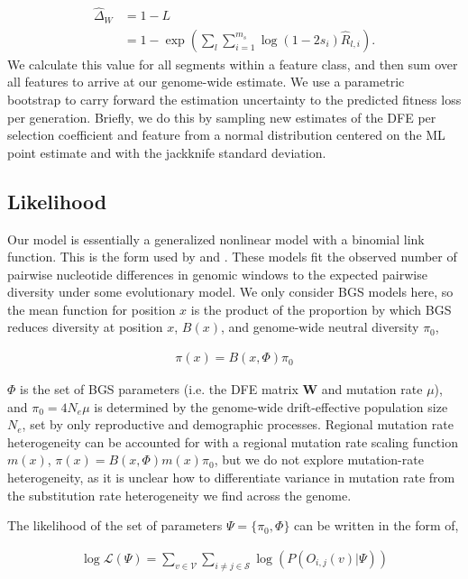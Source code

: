 \documentclass[11pt]{article}
\begin{document}
\begin{align}
    \widehat{\Delta}_W &= 1 - L \\  \nonumber
             &= 1 - \exp\left(\sum_{l} \sum_{i=1}^{m_s} \log(1-2s_i) \widehat{R}_{l,i} \right).
\end{align}
%
We calculate this value for all segments within a feature class, and then sum
over all features to arrive at our genome-wide estimate. We use a parametric
bootstrap to carry forward the estimation uncertainty to the predicted fitness
loss per generation. Briefly, we do this by sampling new estimates of the DFE
per selection coefficient and feature from a normal distribution centered on
the ML point estimate and with the jackknife standard deviation.

\subsection{Likelihood}

Our model is essentially a generalized nonlinear model with a binomial link
function. This is the form used by \textcite{Elyashiv2016-vt} and
\textcite{Murphy2022-sj}. These models fit the observed number of pairwise
nucleotide differences in genomic windows to the expected pairwise diversity
under some evolutionary model. We only consider BGS models here, so the mean
function for position $x$ is the product of the proportion by which BGS reduces
diversity at position $x$, $B(x)$, and genome-wide neutral diversity $\pi_0$,

\begin{align}
  \pi(x) = B(x, \Phi) \pi_0
\end{align}

$\Phi$ is the set of BGS parameters (i.e. the DFE matrix $\mathbf{W}$ and
mutation rate $\mu$), and $\pi_0 = 4 N_e \mu$ is determined by the genome-wide
drift-effective population size $N_e$, set by only reproductive and demographic
processes. Regional mutation rate heterogeneity can be accounted for with a
regional mutation rate scaling function $m(x)$, $\pi(x) = B(x, \Phi) m(x)
\pi_0$, but we do not explore mutation-rate heterogeneity, as it is unclear how
to differentiate variance in mutation rate from the substitution rate
heterogeneity we find across the genome.

The likelihood of the set of parameters $\Psi = \{\pi_0, \Phi\}$ can be written
in the form of, 

\begin{align}
  \log\mathcal{L}(\Psi) = \sum_{v \in \mathcal{V}} \sum_{i \ne j \in \mathcal{S}} \log(P(O_{i,j}(v) | \Psi))
\end{align}
\end{document}

